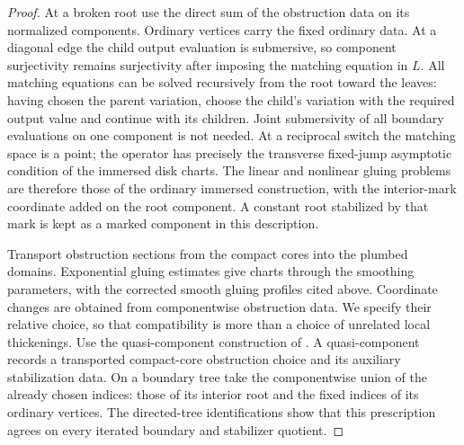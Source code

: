 \documentclass[11pt]{article}
\numberwithin{equation}{section}
\theoremstyle{definition}
\theoremstyle{remark}
\begin{document}
\begin{proof}
At a broken root use the direct sum of the obstruction data on its
normalized components.  Ordinary vertices carry the fixed ordinary
data.  At a diagonal edge the child output evaluation is submersive,
so component surjectivity remains surjectivity after imposing the
matching equation in $L$.  All matching equations can be solved
recursively from the root toward the leaves: having chosen the
parent variation, choose the child's variation with the required
output value and continue with its children.  Joint submersivity
of all boundary evaluations on one component is not needed.
At a reciprocal switch the matching
space is a point; the operator has precisely the transverse
fixed-jump asymptotic condition of the immersed disk charts.
The linear and nonlinear gluing problems are therefore those of
the ordinary immersed construction, with the interior-mark
coordinate added on the root component.  A constant root
stabilized by that mark is kept as a marked component in this
description.

Transport obstruction sections from the compact cores into the
plumbed domains.  Exponential gluing estimates give charts through
the smoothing parameters, with the corrected smooth gluing
profiles cited above.  Coordinate changes are obtained from
componentwise obstruction data.  We specify their relative choice,
so that compatibility is more than a choice of unrelated local
thickenings.  Use the quasi-component construction of
\cite[Conditions~8.12--8.15, Lemmas~8.19--8.20, and
Definition~8.21]{FOOOChartsII}.  A quasi-component records a
transported compact-core obstruction choice and its auxiliary
stabilization data.  On a boundary tree take the componentwise
union of the already chosen indices: those of its interior root
and the fixed indices of its ordinary vertices.  The directed-tree
identifications show that this prescription agrees on every
iterated boundary and stabilizer quotient.


\end{proof}
\end{document}
